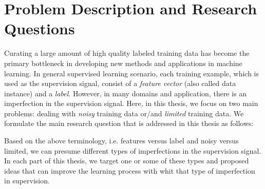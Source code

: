 \section{Problem Description and Research Questions}
Curating a large amount of high quality labeled training data has become the primary bottleneck in developing new methods and applications in machine learning. 
In general supervised learning scenario, each training example, which is used as the supervision signal, consist of a \emph{feature vector} (also called data instance) and a \emph{label}. However, in many domains and application, there is an imperfection in the supervision signal. Here, in this thesis, we focus on two main problems: dealing with \emph{noisy} training data or/and \emph{limited} training data. 
We formulate the main research question that is addressed in this thesis as follows:

Based on the above terminology, i.e. features versus label and noisy versus limited, we can presume different types of imperfections in the supervision signal. In each part of this thesis, we target one or some of these types and proposed ideas that can improve the learning process with whit that type of imperfection in supervision. 


